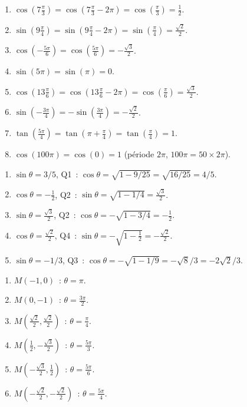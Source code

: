 \begin{enumerate}
  \item $\cos(7\frac{\pi}{3})=\cos(7\frac{\pi}{3}-2\pi)=\cos(\frac{\pi}{3})=\frac{1}{2}$.
  \item $\sin(9\frac{\pi}{4})=\sin(9\frac{\pi}{4}-2\pi)=\sin(\frac{\pi}{4})=\frac{\sqrt{2}}{2}$.
  \item $\cos(-\frac{5\pi}{6})=\cos(\frac{5\pi}{6})=-\frac{\sqrt{3}}{2}$.
  \item $\sin(5\pi)=\sin(\pi)=0$.
  \item $\cos(13\frac{\pi}{6})=\cos(13\frac{\pi}{6}-2\pi)=\cos(\frac{\pi}{6})=\frac{\sqrt{3}}{2}$.
  \item $\sin(-\frac{3\pi}{4})=-\sin(\frac{3\pi}{4})=-\frac{\sqrt{2}}{2}$.
  \item $\tan(\frac{5\pi}{4})=\tan(\pi+\frac{\pi}{4})=\tan(\frac{\pi}{4})=1$.
  \item $\cos(100\pi)=\cos(0)=1$ (p\'eriode $2\pi$, $100\pi=50\times2\pi$).
\end{enumerate}


\begin{enumerate}
  \item $\sin\theta=3/5$, Q1~: $\cos\theta=\sqrt{1-9/25}=\sqrt{16/25}=4/5$.
  \item $\cos\theta=-\frac{1}{2}$, Q2~: $\sin\theta=\sqrt{1-1/4}=\frac{\sqrt{3}}{2}$.
  \item $\sin\theta=\frac{\sqrt{3}}{2}$, Q2~: $\cos\theta=-\sqrt{1-3/4}=-\frac{1}{2}$.
  \item $\cos\theta=\frac{\sqrt{2}}{2}$, Q4~: $\sin\theta=-\sqrt{1-\frac{1}{2}}=-\frac{\sqrt{2}}{2}$.
  \item $\sin\theta=-1/3$, Q3~: $\cos\theta=-\sqrt{1-1/9}=-\sqrt{8}/3=-2\sqrt{2}/3$.
\end{enumerate}


\begin{enumerate}
  \item $M(-1,0)$~: $\theta=\pi$.
  \item $M(0,-1)$~: $\theta=\frac{3\pi}{2}$.
  \item $M(\frac{\sqrt{2}}{2},\frac{\sqrt{2}}{2})$~: $\theta=\frac{\pi}{4}$.
  \item $M(\frac{1}{2},-\frac{\sqrt{3}}{2})$~: $\theta=\frac{5\pi}{3}$.
  \item $M(-\frac{\sqrt{3}}{2},\frac{1}{2})$~: $\theta=\frac{5\pi}{6}$.
  \item $M(-\frac{\sqrt{2}}{2},-\frac{\sqrt{2}}{2})$~: $\theta=\frac{5\pi}{4}$.
\end{enumerate}

